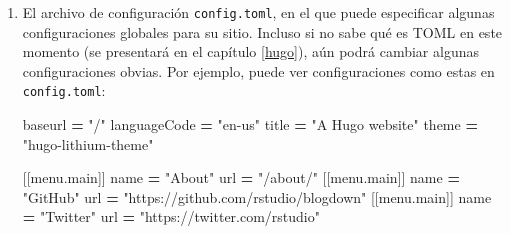 \documentclass[12pt,]{krantz}
\makeatletter
\newenvironment{Shaded}{\begin{snugshade}}{\end{snugshade}}
\newcommand{\AttributeTok}[1]{\textcolor[rgb]{0.77,0.63,0.00}{#1}}
\newcommand{\NormalTok}[1]{#1}
\newcommand{\OperatorTok}[1]{\textcolor[rgb]{0.81,0.36,0.00}{\textbf{#1}}}
\newcommand{\StringTok}[1]{\textcolor[rgb]{0.31,0.60,0.02}{#1}}
\newcommand{\VariableTok}[1]{\textcolor[rgb]{0.00,0.00,0.00}{#1}}
\newenvironment{kframe}{%
\medskip{}
\setlength{\fboxsep}{.8em}
 \def\at@end@of@kframe{}%
 \ifinner\ifhmode%
  \def\at@end@of@kframe{\end{minipage}}%
  \begin{minipage}{\columnwidth}%
 \fi\fi%
 \def\FrameCommand##1{\hskip\@totalleftmargin \hskip-\fboxsep
 \colorbox{shadecolor}{##1}\hskip-\fboxsep
     \hskip-\linewidth \hskip-\@totalleftmargin \hskip\columnwidth}%
 \MakeFramed {\advance\hsize-\width
   \@totalleftmargin\z@ \linewidth\hsize
   \@setminipage}}%
 {\par\unskip\endMakeFramed%
 \at@end@of@kframe}
\renewenvironment{Shaded}{\begin{kframe}}{\end{kframe}}
\theoremstyle{definition}
\theoremstyle{definition}
\theoremstyle{definition}
\theoremstyle{remark}
\makeatother
\begin{document}
\begin{enumerate}
\def\labelenumi{\arabic{enumi}.}
\item
  El archivo de configuración \texttt{config.toml},
  en el que puede especificar algunas configuraciones globales para su
  sitio. Incluso si no sabe qué es TOML en este momento (se presentará
  en el capítulo \ref{hugo}), aún podrá cambiar algunas configuraciones
  obvias. Por ejemplo, puede ver configuraciones como estas en
  \texttt{config.toml}:

\begin{Shaded}
\begin{Highlighting}[]
\NormalTok{baseurl }\OperatorTok{=} \StringTok{"/"}
\NormalTok{languageCode }\OperatorTok{=} \StringTok{"en-us"}
\NormalTok{title }\OperatorTok{=} \StringTok{"A Hugo website"}
\NormalTok{theme }\OperatorTok{=} \StringTok{"hugo-lithium-theme"}

\NormalTok{[[}\VariableTok{menu}\NormalTok{.}\AttributeTok{main}\NormalTok{]]}
\NormalTok{    name }\OperatorTok{=} \StringTok{"About"}
\NormalTok{    url }\OperatorTok{=} \StringTok{"/about/"}
\NormalTok{[[}\VariableTok{menu}\NormalTok{.}\AttributeTok{main}\NormalTok{]]}
\NormalTok{    name }\OperatorTok{=} \StringTok{"GitHub"}
\NormalTok{    url }\OperatorTok{=} \StringTok{"https://github.com/rstudio/blogdown"}
\NormalTok{[[}\VariableTok{menu}\NormalTok{.}\AttributeTok{main}\NormalTok{]]}
\NormalTok{    name }\OperatorTok{=} \StringTok{"Twitter"}
\NormalTok{    url }\OperatorTok{=} \StringTok{"https://twitter.com/rstudio"}
\end{Highlighting}
\end{Shaded}


\end{enumerate}
\end{document}
